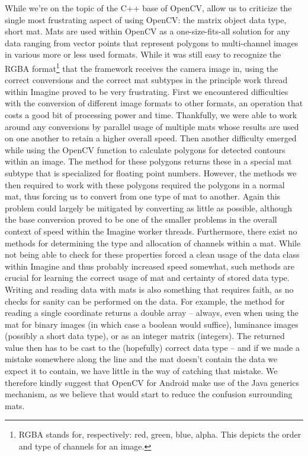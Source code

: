 While we're on the topic of the C++ base of OpenCV, allow us to criticize the single most frustrating aspect of using OpenCV: the matrix object data type, short mat.
Mats are used within OpenCV as a one-size-fits-all solution for any data ranging from vector points that represent polygons to multi-channel images in various more or less used formats.
While it was still easy to recognize the RGBA format\footnote{RGBA stands for, respectively: red, green, blue, alpha. This depicts the order and type of channels for an image.} that the framework receives the camera image in, using the correct conversions and the correct mat subtypes in the principle work thread within Imagine proved to be very frustrating.
First we encountered difficulties with the conversion of different image formats to other formats, an operation that costs a good bit of processing power and time.
Thankfully, we were able to work around any conversions by parallel usage of multiple mats whose results are used on one another to retain a higher overall speed.
Then another difficulty emerged while using the OpenCV function to calculate polygons for detected contours within an image.
The method for these polygons returns these in a special mat subtype that is specialized for floating point numbers.
However, the methods we then required to work with these polygons required the polygons in a normal mat, thus forcing us to convert from one type of mat to another.
Again this problem could largely be mitigated by converting as little as possible, although the base conversion proved to be one of the smaller problems in the overall context of speed within the Imagine worker threads.
Furthermore, there exist no methods for determining the type and allocation of channels within a mat.
While not being able to check for these properties forced a clean usage of the data class within Imagine and thus probably increased speed somewhat, such methods are crucial for learning the correct usage of mat and certainty of stored data type.
Writing and reading data with mats is also something that requires faith, as no checks for sanity can be performed on the data.
For example, the method for reading a single coordinate returns a double array – always, even when using the mat for binary images (in which case a boolean would suffice), luminance images (possibly a short data type), or as an integer matrix (integers).
The returned value then has to be cast to the (hopefully) correct data type – and if we made a mistake somewhere along the line and the mat doesn't contain the data we expect it to contain, we have little in the way of catching that mistake.
We therefore kindly suggest that OpenCV for Android make use of the Java generics mechanism, as we believe that would start to reduce the confusion surrounding mats.

